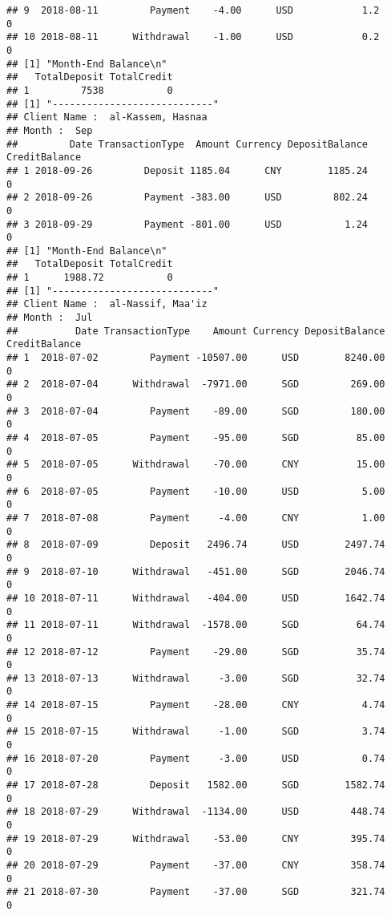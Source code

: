 \documentclass[]{article}
\begin{document}
\begin{verbatim}
## 9  2018-08-11         Payment    -4.00      USD            1.2             0
## 10 2018-08-11      Withdrawal    -1.00      USD            0.2             0
## [1] "Month-End Balance\n"
##   TotalDeposit TotalCredit
## 1         7538           0
## [1] "----------------------------"
## Client Name :  al-Kassem, Hasnaa 
## Month :  Sep 
##         Date TransactionType  Amount Currency DepositBalance CreditBalance
## 1 2018-09-26         Deposit 1185.04      CNY        1185.24             0
## 2 2018-09-26         Payment -383.00      USD         802.24             0
## 3 2018-09-29         Payment -801.00      USD           1.24             0
## [1] "Month-End Balance\n"
##   TotalDeposit TotalCredit
## 1      1988.72           0
## [1] "----------------------------"
## Client Name :  al-Nassif, Maa'iz 
## Month :  Jul 
##          Date TransactionType    Amount Currency DepositBalance CreditBalance
## 1  2018-07-02         Payment -10507.00      USD        8240.00             0
## 2  2018-07-04      Withdrawal  -7971.00      SGD         269.00             0
## 3  2018-07-04         Payment    -89.00      SGD         180.00             0
## 4  2018-07-05         Payment    -95.00      SGD          85.00             0
## 5  2018-07-05      Withdrawal    -70.00      CNY          15.00             0
## 6  2018-07-05         Payment    -10.00      USD           5.00             0
## 7  2018-07-08         Payment     -4.00      CNY           1.00             0
## 8  2018-07-09         Deposit   2496.74      USD        2497.74             0
## 9  2018-07-10      Withdrawal   -451.00      SGD        2046.74             0
## 10 2018-07-11      Withdrawal   -404.00      USD        1642.74             0
## 11 2018-07-11      Withdrawal  -1578.00      SGD          64.74             0
## 12 2018-07-12         Payment    -29.00      SGD          35.74             0
## 13 2018-07-13      Withdrawal     -3.00      SGD          32.74             0
## 14 2018-07-15         Payment    -28.00      CNY           4.74             0
## 15 2018-07-15      Withdrawal     -1.00      SGD           3.74             0
## 16 2018-07-20         Payment     -3.00      USD           0.74             0
## 17 2018-07-28         Deposit   1582.00      SGD        1582.74             0
## 18 2018-07-29      Withdrawal  -1134.00      USD         448.74             0
## 19 2018-07-29      Withdrawal    -53.00      CNY         395.74             0
## 20 2018-07-29         Payment    -37.00      CNY         358.74             0
## 21 2018-07-30         Payment    -37.00      SGD         321.74             0

\end{verbatim}
\end{document}
